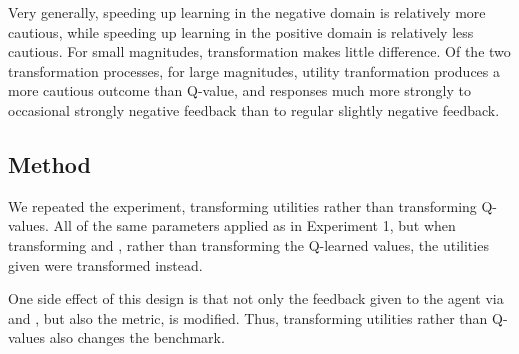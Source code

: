 Very generally, speeding up learning in the negative domain is relatively more cautious, while speeding up learning in the positive domain is relatively less cautious. For small magnitudes, transformation makes little difference. Of the two transformation processes, for large magnitudes, utility tranformation produces a more cautious outcome than Q-value, and responses much more strongly to occasional strongly negative feedback than to regular slightly negative feedback.








\subsection{Method}

We repeated the experiment, transforming utilities rather than transforming Q-values. All of the same parameters applied as in Experiment 1, but when transforming \RP{} and \RA{}, rather than transforming the Q-learned values, the utilities given were transformed instead.

One side effect of this design is that not only the feedback given to the agent via \RP{} and \RA{}, but also the \RStar{} metric, is modified. Thus, transforming utilities rather than Q-values also changes the benchmark.